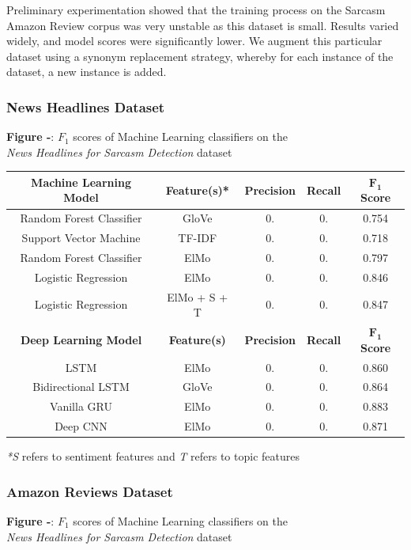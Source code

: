 \documentclass[12pt,a4paper]{article}
\begin{document}
Preliminary experimentation showed that the training process on the Sarcasm Amazon Review corpus was very unstable as this dataset is small. Results varied widely, and model scores were significantly lower. We augment this particular dataset using a synonym replacement strategy, whereby for each instance of the dataset, a new instance is added.



\subsubsection{News Headlines Dataset}
\begin{center}
	\textbf{Figure -}: $F_1$ scores of Machine Learning classifiers on the \\\textit{News Headlines for Sarcasm Detection} dataset
\end{center}

\begin{center}
	\begin{tabular}{ |c||c|c|c|c|}
		\hline
		\textbf{Machine Learning Model}& \textbf{Feature(s)*} & \textbf{Precision} & \textbf{Recall} & \textbf{$\mathbf{F_1}$ Score}\\
		\hline\hline
		Random Forest Classifier & GloVe  & 0.   & 0. & 0.754\\
		Support Vector Machine & TF-IDF  & 0.   & 0. & 0.718\\
		Random Forest Classifier & ElMo  & 0.   & 0. & 0.797\\
		Logistic Regression & ElMo  & 0.   & 0. & 0.846\\
		Logistic Regression & ElMo + S + T & 0.   & 0. & 0.847\\
		\hline\hline
		\textbf{Deep Learning Model}& \textbf{Feature(s)} & \textbf{Precision} & \textbf{Recall} & \textbf{$\mathbf{F_1}$ Score}\\
		\hline
		LSTM & ElMo  & 0.   & 0. & 0.860\\
		Bidirectional LSTM & GloVe  & 0.   & 0. & 0.864\\
		Vanilla GRU & ElMo  & 0.   & 0. & 0.883\\
		Deep CNN & ElMo & 0.   & 0. & 0.871\\
		\hline
	\end{tabular}
\end{center}
\textit{*S} refers to sentiment features and \textit{T} refers to topic features

\newpage
\subsubsection{Amazon Reviews Dataset}
\begin{center}
	\textbf{Figure -}: $F_1$ scores of Machine Learning classifiers on the \\\textit{News Headlines for Sarcasm Detection} dataset
\end{center}
\end{document}
